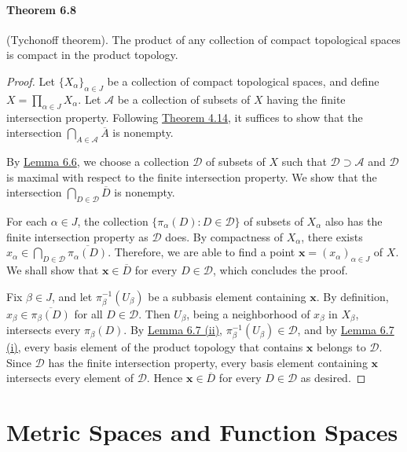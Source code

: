 \documentclass{article}
\numberwithin{equation}{section}
\theoremstyle{plain}
\theoremstyle{definition}
\begin{document}
\paragraph{Theorem 6.8\label{thm:6.8}} (Tychonoff theorem). The product of any collection of compact topological spaces is compact in the product topology.
\begin{proof}
Let $\{X_\alpha\}_{\alpha\in J}$ be a collection of compact topological spaces, and define $X=\prod_{\alpha\in J} X_\alpha$. Let $\mathscr{A}$ be a collection of subsets of $X$ having the finite intersection property. Following \hyperref[thm:4.14]{Theorem 4.14}, it suffices to show that the intersection $\bigcap_{A\in\mathscr{A}}\overline{A}$ is nonempty.

By \hyperref[lemma:6.6]{Lemma 6.6}, we choose a collection $\mathscr{D}$ of subsets of $X$ such that $\mathscr{D}\supset\mathscr{A}$ and $\mathscr{D}$ is maximal with respect to the finite intersection property. We show that the intersection $\bigcap_{D\in\mathscr{D}}\overline{D}$ is nonempty.

For each $\alpha\in J$, the collection $\{\pi_\alpha(D):D\in\mathscr{D}\}$
of subsets of $X_\alpha$ also has the finite intersection property as $\mathscr{D}$ does. By compactness of $X_\alpha$, there exists $x_\alpha\in\bigcap_{D\in\mathscr{D}}\overline{\pi_\alpha(D)}$. Therefore, we are able to find a point $\mathbf{x}=(x_\alpha)_{\alpha\in J}$ of $X$. We shall show that $\mathbf{x}\in\overline{D}$ for every $D\in\mathscr{D}$, which concludes the proof.

Fix $\beta\in J$, and let $\pi_\beta^{-1}(U_\beta)$ be a subbasis element containing $\mathbf{x}$. By definition, $x_\beta\in\overline{\pi_\beta(D)}$ for all $D\in\mathscr{D}$. Then $U_\beta$, being a neighborhood of $x_\beta$ in $X_\beta$, intersects every $\pi_\beta(D)$. By \hyperref[lemma:6.7]{Lemma 6.7 (ii)}, $\pi_\beta^{-1}(U_\beta)\in\mathscr{D}$, and by \hyperref[lemma:6.7]{Lemma 6.7 (i)}, every basis element of the product topology that contains $\mathbf{x}$ belongs to $\mathscr{D}$. Since $\mathscr{D}$ has the finite intersection property, every basis element containing $\mathbf{x}$ intersects every element of $\mathscr{D}$. Hence $\mathbf{x}\in\overline{D}$ for every $D\in\mathscr{D}$ as desired.
\end{proof}

\newpage
\section{Metric Spaces and Function Spaces}
\end{document}
